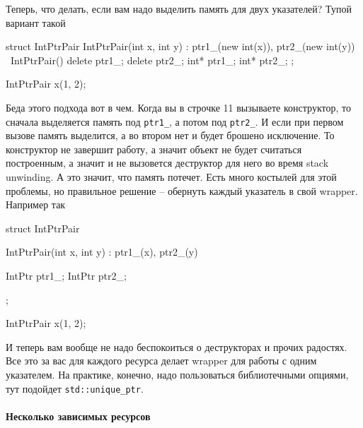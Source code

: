 Теперь, что делать, если вам надо выделить память для двух указателей?
Тупой вариант такой
\begin{cppcode}
struct IntPtrPair {
  IntPtrPair(int x, int y) : ptr1_(new int(x)), ptr2_(new int(y)) {}
  ~IntPtrPair() {
    delete ptr1_;
    delete ptr2_;
  }
  int* ptr1_;
  int* ptr2_;
};

IntPtrPair x(1, 2);
\end{cppcode}
Беда этого подхода вот в чем.
Когда вы в строчке 11 вызываете конструктор, то сначала выделяется память под \verb"ptr1_", а потом под \verb"ptr2_".
И если при первом вызове память выделится, а во втором нет и будет брошено исключение.
То конструктор не завершит работу, а значит объект не будет считаться построенным, а значит и не вызовется деструктор для него во время stack unwinding.
А это значит, что память потечет.
Есть много костылей для этой проблемы, но правильное решение -- обернуть каждый указатель в свой wrapper.
Например так
\begin{cppcode}
struct IntPtrPair {
  IntPtrPair(int x, int y) : ptr1_(x), ptr2_(y) {}

  IntPtr ptr1_;
  IntPtr ptr2_;
};

IntPtrPair x(1, 2);
\end{cppcode}
И теперь вам вообще не надо беспокоиться о деструкторах и прочих радостях.
Все это за вас для каждого ресурса делает wrapper для работы с одним указателем.
На практике, конечно, надо пользоваться библиотечными опциями, тут подойдет \verb"std::unique_ptr".

\paragraph{Несколько зависимых ресурсов}

